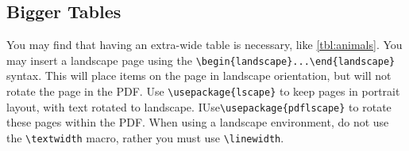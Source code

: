 \subsection{Bigger Tables}
You may find that having an extra-wide table is necessary, like \cref{tbl:animals}. You may insert a landscape page using the \verb|\begin{landscape}...\end{landscape}| syntax. This will place items on the page in landscape orientation, but will not rotate the page in the PDF.  Use \verb|\usepackage{lscape}| to keep pages in portrait layout, with text rotated to landscape. IUse\verb|\usepackage{pdflscape}| to rotate these pages within the PDF. When using a landscape environment, do not use the \verb|\textwidth| macro, rather you must use \verb|\linewidth|.


